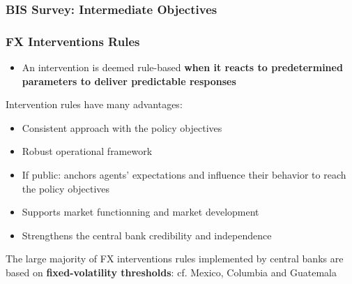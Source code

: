 \documentclass{beamer}
\begin{document}
\begin{frame}
  \frametitle{BIS Survey: Intermediate Objectives}
\end{frame}


\begin{frame}
  \frametitle{FX Interventions Rules}

  \begin{itemize}
  \item An intervention is deemed rule-based
    \textbf{when it reacts to predetermined parameters to deliver predictable responses}
  \end{itemize}
  
Intervention rules have many advantages:
\begin{itemize}
\item Consistent approach with the policy objectives
\item Robust operational framework
\item If public: anchors agents' expectations and influence their behavior to
  reach the policy objectives 
\item Supports market functionning and market development
\item Strengthens the central bank credibility and independence
\end{itemize}

The large majority of FX interventions rules implemented by central banks are
based on \textbf{fixed-volatility thresholds}: cf. Mexico, Columbia and Guatemala
\end{frame}
\end{document}
